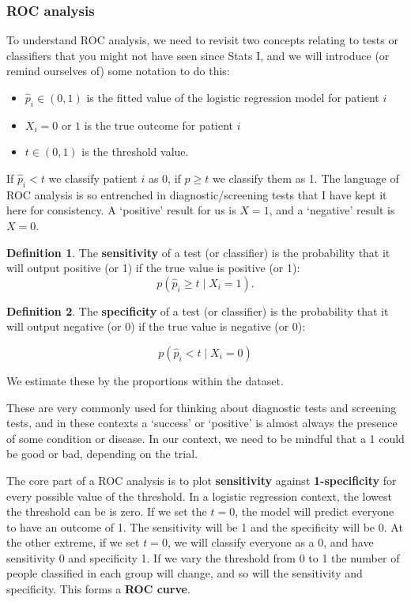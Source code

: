 \documentclass[
  openany]{book}
\providecommand{\tightlist}{%
  \setlength{\itemsep}{0pt}\setlength{\parskip}{0pt}}
\theoremstyle{definition}
\newtheorem{definition}{Definition}[chapter]
\theoremstyle{definition}
\theoremstyle{definition}
\theoremstyle{definition}
\theoremstyle{remark}
\begin{document}
\hypertarget{roc-analysis}{%
\subsubsection{ROC analysis}\label{roc-analysis}}

To understand ROC analysis, we need to revisit two concepts relating to tests or classifiers that you might not have seen since Stats I, and we will introduce (or remind ourselves of) some notation to do this:

\begin{itemize}
\tightlist
\item
  \(\hat{p}_i\in\left(0,1\right)\) is the fitted value of the logistic regression model for patient \(i\)
\item
  \(X_i=0\) or \(1\) is the true outcome for patient \(i\)
\item
  \(t\in\left(0,1\right)\) is the threshold value.
\end{itemize}

If \(\hat{p}_i<t\) we classify patient \(i\) as 0, if \(\hat{p}\geq t\) we classify them as 1. The language of ROC analysis is so entrenched in diagnostic/screening tests that I have kept it here for consistency. A `positive' result for us is \(X=1\), and a `negative' result is \(X=0\).

\begin{definition}
The \textbf{sensitivity} of a test (or classifier) is the probability that it will output positive (or 1) if the true value is positive (or 1):
\[p\left(\hat{p}_i \geq t \mid{X_i=1}\right).\]
\end{definition}

\begin{definition}
The \textbf{specificity} of a test (or classifier) is the probability that it will output negative (or 0) if the true value is negative (or 0):

\[p\left(\hat{p}_i < t \mid{X_i=0}\right) \]
\end{definition}

We estimate these by the proportions within the dataset.

These are very commonly used for thinking about diagnostic tests and screening tests, and in these contexts a `success' or `positive' is almost always the presence of some condition or disease. In our context, we need to be mindful that a 1 could be good or bad, depending on the trial.

The core part of a ROC analysis is to plot \textbf{sensitivity} against \textbf{1-specificity} for every possible value of the threshold. In a logistic regression context, the lowest the threshold can be is zero. If we set the \(t=0\), the model will predict everyone to have an outcome of 1. The sensitivity will be 1 and the specificity will be 0. At the other extreme, if we set \(t=0\), we will classify everyone as a 0, and have sensitivity 0 and specificity 1. If we vary the threshold from 0 to 1 the number of people classified in each group will change, and so will the sensitivity and specificity. This forms a \textbf{ROC curve}.
\end{document}
